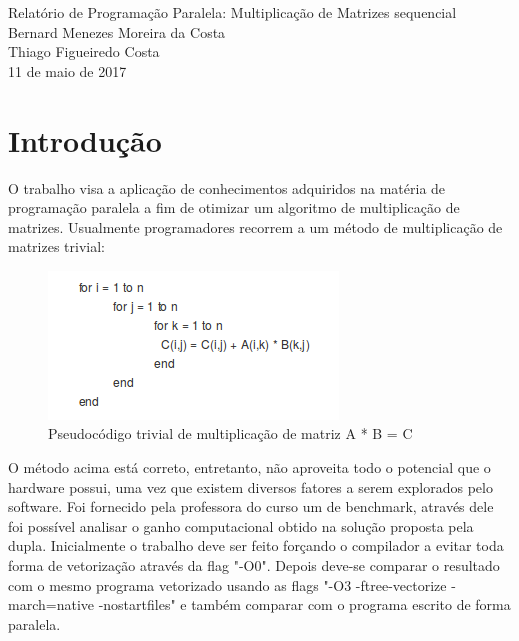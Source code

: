 \documentclass[a4paper, 10pt]{article}
\begin{document}
\begin{center}
{\huge Relatório de Programação Paralela: Multiplicação de Matrizes sequencial \\[7.5cm]}
{\Large Bernard Menezes Moreira da Costa\\Thiago Figueiredo Costa\\[10cm]11 de maio de 2017}
\end{center}
\newpage
\section{Introdução}
O trabalho visa a aplicação de conhecimentos adquiridos na matéria de programação paralela a fim de otimizar um algoritmo de multiplicação de matrizes. Usualmente programadores recorrem a um método de multiplicação de matrizes trivial:
\begin{figure}[!h]
\centering
\includegraphics[scale=0.6]{pseudocodigo}
\caption{Pseudocódigo trivial de multiplicação de matriz A * B = C}
\label{Pseudocódigo}
\end{figure}

O método acima está correto, entretanto, não aproveita todo o potencial que o hardware possui, uma vez que existem diversos fatores a serem explorados pelo software. Foi fornecido pela professora do curso um de benchmark, através dele foi possível analisar o ganho computacional obtido na solução proposta pela dupla. Inicialmente o trabalho deve ser feito forçando o compilador a evitar toda forma de vetorização através da flag "-O0". Depois deve-se comparar o resultado com o mesmo programa vetorizado usando as flags "-O3 -ftree-vectorize -march=native -nostartfiles" e também comparar com o programa escrito de forma paralela.
\end{document}
